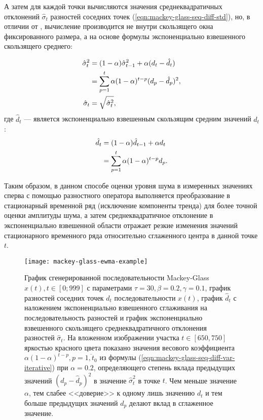 А затем для каждой точки вычисляются значения среднеквадратичных отклонений $\hat{\sigma}_t$ разностей соседних точек (\ref{eqn:mackey-glass-seq-diff-std}), но, в отличии от \cite{Pekaslan2020}, вычисление производится не внутри скользящего окна фиксированного размера, а на основе формулы экспоненциально взвешенного скользящего среднего:

\begin{align}
	\hat{\sigma}^2_t &= (1-\alpha) \hat{\sigma}^2_{t-1} + \alpha (d_t - \hat{d}_t) \notag \\
			  		 &= \sum_{p=1}^t \alpha (1-\alpha)^{t-p} (d_p - \hat{d}_p)^2, \label{eqn:mackey-glass-seq-diff-var-iterative} \\
	\hat{\sigma}_t &= \sqrt{\hat{\sigma}^2_t}, \label{eqn:mackey-glass-seq-diff-std}
\end{align}
где $\hat{d}_t$ --- является экспоненциально взвешенным скользящим средним значений $d_t$:
\begin{align}
	\hat{d}_t &= (1-\alpha) \hat{d}_{t-1} + \alpha d_t \notag \\
	&= \sum_{p=1}^t \alpha (1-\alpha)^{t-p} d_p. %
	\label{eqn:mackey-glass-seq-diff-mean}
\end{align}

Таким образом, в данном способе оценки уровня шума в измеренных значениях \cite{Rank1999} сперва с помощью разностного оператора выполняется преобразование в стационарный временной ряд (исключение компоненты тренда) для более точной оценки амплитуды шума, а затем среднеквадратичное отклонение в экспоненциально взвешенной области отражает резкие изменения значений стационарного временного ряда относительно сглаженного центра в данной точке $t$.

\begin{figure}[ht]
	\centering
	\texttt{[image: mackey-glass-ewma-example]}
	\caption{График сгенерированной последовательности Mackey-Glass $x(t), t\in[0;999]$ с параметрами $\tau = 30, \beta = 0.2, \gamma = 0.1$, график разностей соседних точек $d_t$ последовательности $x(t)$, график $\hat{d}_t$ с наложением экспоненциально взвешенного сглаживания на последовательность разностей и график экспоненциально взвешенного скользящего среднеквадратичного отклонения разностей $\hat{\sigma}_t$. На вложенном изображении участка $t\in[650,750]$ яркостью красного цвета показано значения весового коэффициента $\alpha (1-\alpha)^{t-p}, p=\overline{1,t_0}$ из формулы (\ref{eqn:mackey-glass-seq-diff-var-iterative}) при $\alpha = 0.2$, определяющего степень вклада предыдущих значений $(d_p - \hat{d}_p)^2$ в значение $\hat{\sigma}^2_t$ в точке $t$. Чем меньше значение $\alpha$, тем слабее <<доверие>> к одному лишь значению $d_t$ и тем больше предыдущих значений $d_p$ делают вклад в сглаженное значение.}
	\label{fig:mackey-glass-ewma-example}
\end{figure}

